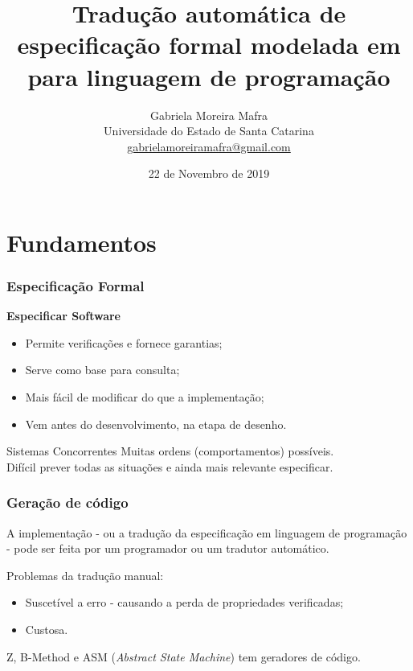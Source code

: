 \documentclass{beamer}
\title[De \TLA para linguagem de programação]{Tradução automática de especificação formal modelada em \TLA para linguagem de programação}
\author[Gabriela M. Mafra]{
    Gabriela Moreira Mafra\\\smallskip
    {\scriptsize Universidade do Estado de Santa Catarina \\\smallskip
    \vspace{-2mm}
    \url{gabrielamoreiramafra@gmail.com}}
}
\begin{document}
  \date{22 de Novembro de 2019}
  \begin{frame}
      \titlepage
  \end{frame}

\tableofcontents

\section{Fundamentos}

\begin{frame}
  \frametitle{Especificação Formal}

    \textbf{Especificar Software}
    \begin{itemize}
    \item Permite verificações e fornece garantias;
    \item Serve como base para consulta;
    \item Mais fácil de modificar do que a implementação;
    \item Vem antes do desenvolvimento, na etapa de desenho.
    \end{itemize}
    \begin{block}{Sistemas Concorrentes}
      Muitas ordens (comportamentos) possíveis.\\
      Difícil prever todas as situações e ainda mais relevante especificar.
    \end{block}
\end{frame}

\begin{frame}
  \frametitle{Geração de código}

  A implementação - ou a tradução da especificação em linguagem de programação - pode ser feita por um programador ou um tradutor automático.\medskip

  Problemas da tradução manual:
  \begin{itemize}
    \item Suscetível a erro - causando a perda de propriedades verificadas;
    \item Custosa.
  \end{itemize}\medskip

  Z, B-Method e ASM (\textit{Abstract State Machine}) tem geradores de código.\medskip

\end{frame}
\end{document}

